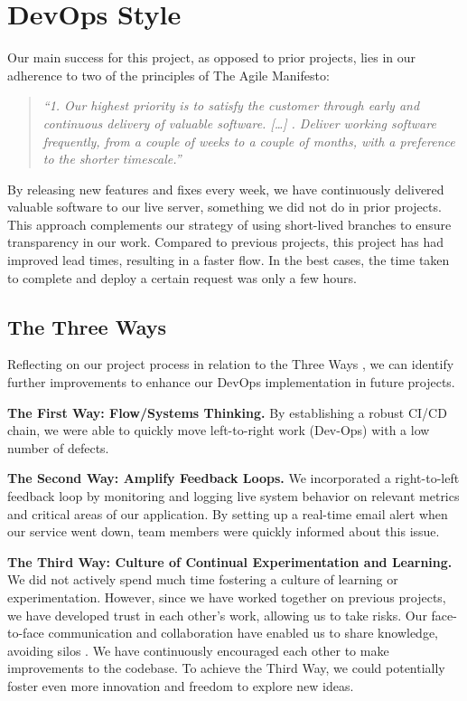 \section{DevOps Style}

Our main success for this project, as opposed to prior projects, lies in our adherence to two of the principles of The Agile Manifesto:

\begin{quote}
    \textit{“1. Our highest priority is to satisfy the customer through early and continuous delivery of valuable software. […] . Deliver working software frequently, from a couple of weeks to a couple of months, with a preference to the shorter timescale.”} \cite{agilemanifesto}
\end{quote}

By releasing new features and fixes every week, we have continuously delivered valuable software to our live server, something we did not do in prior projects. This approach complements our strategy of using short-lived branches to ensure transparency in our work. Compared to previous projects, this project has had improved lead times, resulting in a faster flow. In the best cases, the time taken to complete and deploy a certain request was only a few hours.

\subsection{The Three Ways}

Reflecting on our project process in relation to the Three Ways \cite{DevOps_gates}, we can identify further improvements to enhance our DevOps implementation in future projects.

\textbf{The First Way: Flow/Systems Thinking.} By establishing a robust CI/CD chain, we were able to quickly move left-to-right work (Dev-Ops) with a low number of defects.

\textbf{The Second Way: Amplify Feedback Loops.} We incorporated a right-to-left feedback loop by monitoring and logging live system behavior on relevant metrics and critical areas of our application. By setting up a real-time email alert when our service went down, team members were quickly informed about this issue.

\textbf{The Third Way: Culture of Continual Experimentation and Learning.} We did not actively spend much time fostering a culture of learning or experimentation. However, since we have worked together on previous projects, we have developed trust in each other's work, allowing us to take risks. Our face-to-face communication and collaboration have enabled us to share knowledge, avoiding silos \cite{agilemanifesto}. We have continuously encouraged each other to make improvements to the codebase. To achieve the Third Way, we could potentially foster even more innovation and freedom to explore new ideas.

